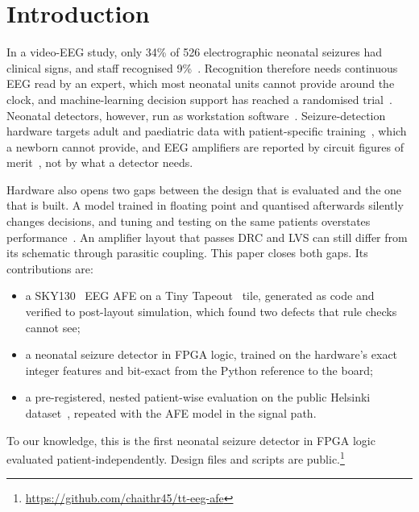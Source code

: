 \documentclass[conference]{IEEEtran}
\newif\ifblind
\begin{document}
\section{Introduction}

In a video-EEG study, only 34\% of 526 electrographic neonatal seizures had clinical signs, and staff recognised 9\%~\cite{murray2008}. Recognition therefore needs continuous EEG read by an expert, which most neonatal units cannot provide around the clock, and machine-learning decision support has reached a randomised trial~\cite{pavel2020}. Neonatal detectors, however, run as workstation software~\cite{temko2011,ansari2019,oshea2020}. Seizure-detection hardware targets adult and paediatric data with patient-specific training~\cite{verma2010,shoaran2018,shin2022,busia2025}, which a newborn cannot provide, and EEG amplifiers are reported by circuit figures of merit~\cite{harrison2003,lee2019,park2022}, not by what a detector needs.

Hardware also opens two gaps between the design that is evaluated and the one that is built. A model trained in floating point and quantised afterwards silently changes decisions, and tuning and testing on the same patients overstates performance~\cite{varma2006}. An amplifier layout that passes DRC and LVS can still differ from its schematic through parasitic coupling. This paper closes both gaps. Its contributions are:
\begin{itemize}
\item a SKY130~\cite{sky130} EEG AFE on a Tiny Tapeout~\cite{tinytapeout} tile, generated as code and verified to post-layout simulation, which found two defects that rule checks cannot see;
\item a neonatal seizure detector in FPGA logic, trained on the hardware's exact integer features and bit-exact from the Python reference to the board;
\item a pre-registered, nested patient-wise evaluation on the public Helsinki dataset~\cite{stevenson2019}, repeated with the AFE model in the signal path.
\end{itemize}
To our knowledge, this is the first neonatal seizure detector in FPGA logic evaluated patient-independently. \ifblind Design files and scripts will be made public after review.\else Design files and scripts are public.\footnote{\url{https://github.com/chaithr45/tt-eeg-afe}}\fi
\end{document}
